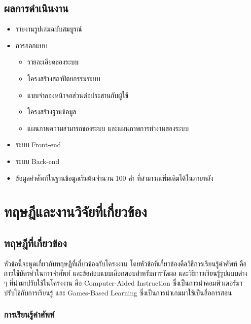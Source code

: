 \documentclass[12pt,oneside,openright,a4paper]{cpe-thai-project}
\begin{document}
\section{ผลการดำเนินงาน}

\begin{itemize}
	\item รายงานรูปเล่มฉบับสมบูรณ์
	\item การออกแบบ
	      \begin{itemize}
		      \item รายละเอียดของระบบ
		      \item โครงสร้างสถาปัตยกรรมระบบ
		      \item แบบจำลองหน้าจอส่วนต่อประสานกับผู้ใช้
		      \item โครงสร้างฐานข้อมูล
		      \item แผนภาพความสามารถของระบบ และแผนภาพการทำงานของระบบ
	      \end{itemize}
	\item ระบบ Front-end
	\item ระบบ Back-end
	\item ข้อมูลคำศัพท์ในฐานข้อมูลเริ่มต้นจำนวน 100 คำ ที่สามารถเพิ่มเติมได้ในภายหลัง
\end{itemize}


\chapter{ทฤษฎีและงานวิจัยที่เกี่ยวข้อง}


\section{ทฤษฎีที่เกี่ยวข้อง}

\hspace{1cm}
หัวข้อนี้จะพูดเกี่ยวกับทฤษฎีที่เกี่ยวข้องกับโครงงาน โดยหัวข้อที่เกี่ยวข้องคือวิธีการเรียนรู้คำศัพท์
คือการใช้บัตรคำในการจำศัพท์ และข้อสอบแบบเลือกตอบสำหรับการวัดผล และวิธีการเรียนรู้รูปแบบต่าง ๆ
ที่นำมาปรับใช้ในโครงงาน คือ Computer-Aided Instruction ซึ่งเป็นการนำคอมพิวเตอร์มาปรับใช้กับการเรียนรู้
และ Games-Based Learning ซึ่งเป็นการนำเกมมาใช้เป็นสื่อการสอน

\subsection{การเรียนรู้คำศัพท์ \cite{LearnEng}}
\end{document}

